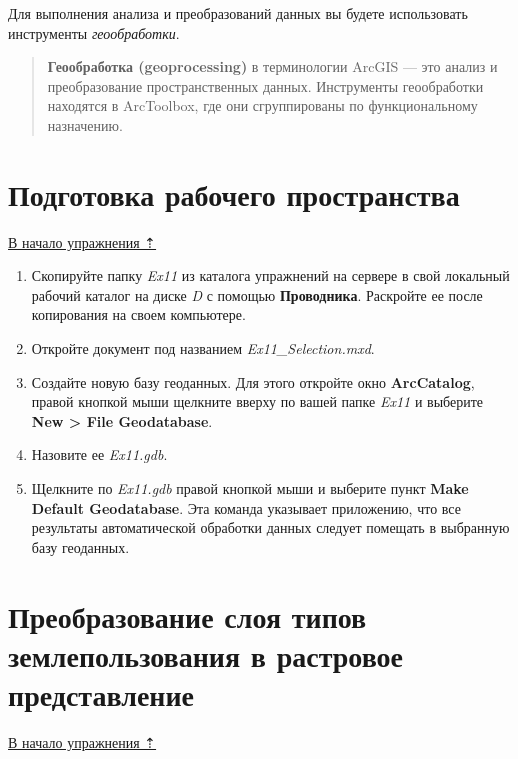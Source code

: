 \documentclass[]{book}
\theoremstyle{definition}
\theoremstyle{definition}
\theoremstyle{definition}
\theoremstyle{remark}
\begin{document}
Для выполнения анализа и преобразований данных вы будете использовать
инструменты \emph{геообработки}.

\begin{quote}
\textbf{Геообработка (geoprocessing)} в терминологии ArcGIS --- это
анализ и преобразование пространственных данных. Инструменты
геообработки находятся в ArcToolbox, где они сгруппированы по
функциональному назначению.
\end{quote}

\hypertarget{weighted-overlay-workspace}{%
\section{Подготовка рабочего
пространства}\label{weighted-overlay-workspace}}

\protect\hyperlink{weighted-overlay}{В начало упражнения ⇡}

\begin{enumerate}
\def\labelenumi{\arabic{enumi}.}
\item
  Скопируйте папку \emph{Ex11} из каталога упражнений на сервере в свой
  локальный рабочий каталог на диске \emph{D} с помощью
  \textbf{Проводника}. Раскройте ее после копирования на своем
  компьютере.
\item
  Откройте документ под названием \emph{Ex11\_Selection.mxd}.
\item
  Создайте новую базу геоданных. Для этого откройте окно
  \textbf{ArcCatalog}, правой кнопкой мыши щелкните вверху по вашей
  папке \emph{Ex11} и выберите \textbf{New \textgreater{} File
  Geodatabase}.
\item
  Назовите ее \emph{Ex11.gdb}.
\item
  Щелкните по \emph{Ex11.gdb} правой кнопкой мыши и выберите пункт
  \textbf{Make Default Geodatabase}. Эта команда указывает приложению,
  что все результаты автоматической обработки данных следует помещать в
  выбранную базу геоданных.
\end{enumerate}

\hypertarget{weighted-overlay-rasterize}{%
\section{Преобразование слоя типов землепользования в растровое
представление}\label{weighted-overlay-rasterize}}

\protect\hyperlink{ux432ux44bux431ux43eux440-ux43eux43fux442ux438ux43cux430ux43bux44cux43dux43eux433ux43e-ux43cux435ux441ux442ux43eux43fux43eux43bux43eux436ux435ux43dux438ux44f}{В
начало упражнения ⇡}
\end{document}
